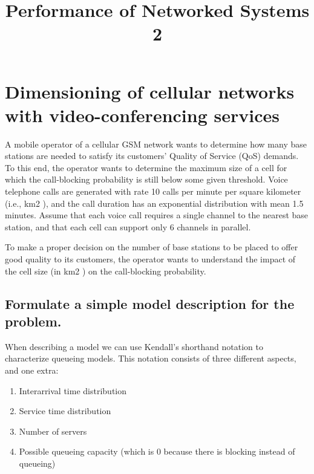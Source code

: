 \documentclass[11pt]{article}
\title{Performance of Networked Systems 2}
\providecommand{\tightlist}{%
      \setlength{\itemsep}{0pt}\setlength{\parskip}{0pt}}
\begin{document}
    
    
    \maketitle
    
    

    
    \section{Dimensioning of cellular networks with video-conferencing
services}\label{dimensioning-of-cellular-networks-with-video-conferencing-services}

A mobile operator of a cellular GSM network wants to determine how many
base stations are needed to satisfy its customers' Quality of Service
(QoS) demands. To this end, the operator wants to determine the maximum
size of a cell for which the call-blocking probability is still below
some given threshold. Voice telephone calls are generated with rate 10
calls per minute per square kilometer (i.e., km2 ), and the call
duration has an exponential distribution with mean 1.5 minutes. Assume
that each voice call requires a single channel to the nearest base
station, and that each cell can support only 6 channels in parallel.

To make a proper decision on the number of base stations to be placed to
offer good quality to its customers, the operator wants to understand
the impact of the cell size (in km2 ) on the call-blocking probability.

    \subsection{Formulate a simple model description for the
problem.}\label{formulate-a-simple-model-description-for-the-problem.}

    When describing a model we can use Kendall's shorthand notation to
characterize queueing models. This notation consists of three different
aspects, and one extra:

\begin{enumerate}
\def\labelenumi{\arabic{enumi}.}
\tightlist
\item
  Interarrival time distribution
\item
  Service time distribution
\item
  Number of servers
\item
  Possible queueing capacity (which is 0 because there is blocking
  instead of queueing)
\end{enumerate}
\end{document}
